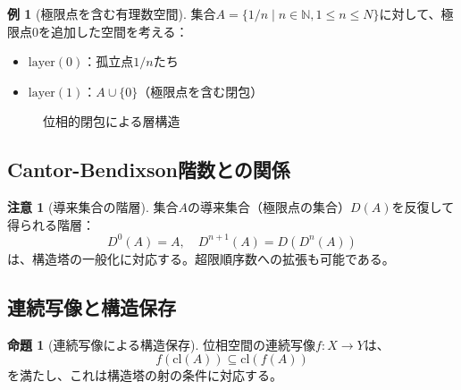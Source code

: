 \documentclass[a4paper,12pt]{ltjsarticle}
\theoremstyle{definition}
\newtheorem{proposition}[definition]{命題}
\newtheorem{example}[definition]{例}
\newtheorem{remark}[definition]{注意}
\begin{document}
\begin{example}[極限点を含む有理数空間]
集合$A = \{1/n \mid n \in \mathbb{N}, 1 \leq n \leq N\}$に対して、極限点$0$を追加した空間を考える：
\begin{itemize}
\item $\text{layer}(0)$：孤立点$1/n$たち
\item $\text{layer}(1)$：$A \cup \{0\}$（極限点を含む閉包）
\end{itemize}
\end{example}

\begin{figure}[h]
\centering
{}
\caption{位相的閉包による層構造}
\end{figure}

\subsection{Cantor-Bendixson階数との関係}

\begin{remark}[導来集合の階層]
集合$A$の導来集合（極限点の集合）$D(A)$を反復して得られる階層：
$$D^0(A) = A, \quad D^{n+1}(A) = D(D^n(A))$$
は、構造塔の一般化に対応する。超限順序数への拡張も可能である。
\end{remark}

\subsection{連続写像と構造保存}

\begin{proposition}[連続写像による構造保存]
位相空間の連続写像$f: X \to Y$は、
$$f(\text{cl}(A)) \subseteq \text{cl}(f(A))$$
を満たし、これは構造塔の射の条件に対応する。
\end{proposition}
\end{document}
